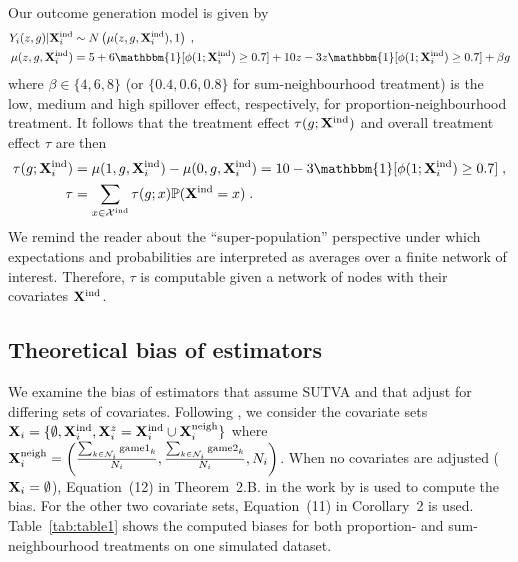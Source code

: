 \documentclass[10pt]{article}
\begin{document}
Our outcome generation model is given by
\begin{align*}
Y_i(z,g)|\Xind_i &\sim N\left(\mu(z,g,\Xind_i),1\right) \;, \\
\mu(z,g,\Xind_i) &= 5 + 6\mathbbm{1}[\phi(1;\Xind_i)\geq 0.7] + 10z - 3z\mathbbm{1}[\phi(1;\Xind_i)\geq0.7] + \beta g
\end{align*}
where $\beta\in\{4,6,8\}$ (or $\{0.4,0.6,0.8\}$ for sum-neighbourhood treatment) is the low, medium and high spillover effect, respectively, for proportion-neighbourhood treatment. It follows that the treatment effect $\tau(g;
\mathbf{X}^{\text{ind}})$ and overall treatment effect $\tau$ are then
\begin{align*}
\tau(g;\Xind_i) &= \mu(1,g,\Xind_i) - \mu(0,g,\Xind_i) = 10 - 3\mathbbm{1}[\phi(1;\Xind_i)\geq0.7] \;, \\
\tau &= \sum_{x\in\calX^\text{ind}}\tau(g;x)\P(\Xind=x) \;.
\end{align*}
We remind the reader about the ``super-population'' perspective \parencite{Imbens:2015} under which expectations and probabilities are interpreted as averages over a finite network of interest. Therefore, $\tau$ is computable given a network of nodes with their covariates $\mathbf{X}^{\text{ind}}$.

\subsection{Theoretical bias of estimators}

We examine the bias of estimators that assume SUTVA and that adjust for differing sets of covariates. Following \textcite{Forastiere:2021}, we consider the covariate sets $\mathbf{X}_i=\{\emptyset,\mathbf{X}^{\text{ind}}_i,\mathbf{X}_i^z=\mathbf{X}^{\text{ind}}_i\cup\mathbf{X}^{\text{neigh}}_i\}$ where $\mathbf{X}^{\text{neigh}}_i=\left(\frac{\sum_{k\in\mathcal{N}_i}\text{game1}_k}{N_i},\frac{\sum_{k\in\mathcal{N}_i}\text{game2}_k}{N_i},N_i\right)$. When no covariates are adjusted ($\mathbf{X}_i=\emptyset$), Equation~(12) in Theorem~2.B. in the work by \textcite{Forastiere:2021} is used to compute the bias. For the other two covariate sets, Equation~(11) in Corollary~2 is used. Table~\ref{tab:table1} shows the computed biases for both proportion- and sum-neighbourhood treatments on one simulated dataset.
\\
\end{document}
